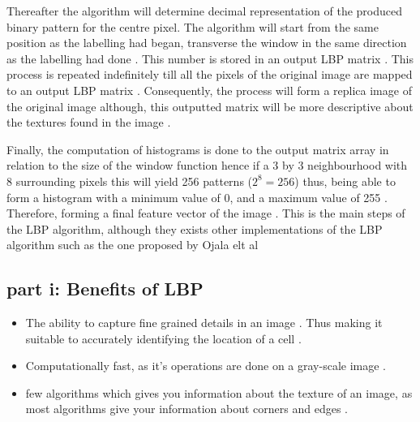 \documentclass[conference]{IEEEtran}
\begin{document}
Thereafter the algorithm will determine decimal representation of the produced binary pattern for the centre pixel. The algorithm will start from the same position as the labelling had began, transverse the window in the same direction as the labelling had done \cite{b5}. This number is stored in an output LBP matrix \cite{b5}. This process is repeated indefinitely till all the pixels of the original image are mapped to an output LBP matrix \cite{b5}. Consequently, the process will form a replica image of the original image although, this outputted matrix will be more descriptive about the textures found in the image \cite{b5}. \par

Finally, the computation of histograms is done to the output matrix array in relation to the size of the window function hence if a 3 by 3 neighbourhood with 8 surrounding pixels this will yield 256 patterns ($2^{8} = 256$) thus, being able to form a histogram with a minimum value of 0, and a maximum value of 255 \cite{b5}. Therefore, forming a final feature vector of the image \cite{b5}. This is the main steps of the LBP algorithm, although they exists other implementations of the LBP algorithm such as the one proposed by Ojala elt al \cite{b5}

\subsection{part i: Benefits of LBP}
\begin{itemize}
	\item The ability to capture fine grained details in an image \cite{b5}. Thus making it suitable to accurately identifying the location of a cell \cite{b6}.
	\item Computationally fast, as it's operations are done on a gray-scale image \cite{b7} \cite{b8} \cite{b10}.
	\item few algorithms which gives you information about the texture of an image, as most algorithms give your information about corners and edges \cite{b8}.
\end{itemize}
\end{document}
